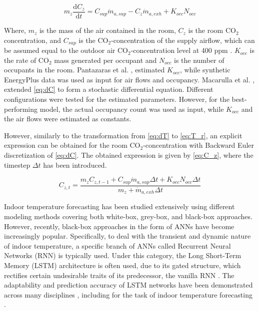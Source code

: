 \begin{equation}
    m_z \frac{\mathrm{d} C_z}{\mathrm{d} t} = C_{sup}\dot{m}_{a,sup} - C_z\dot{m}_{a,exh} + K_{occ} N_{occ}
    \label{eq:dC}
\end{equation}

Where, $m_z$ is the mass of the air contained in the room, $C_z$ is the room CO$_2$ concentration, and $C_{sup}$ is the CO$_2$-concentration of the supply airflow, which can be assumed equal to the outdoor air CO$_2$-concentration level at 400 ppm \cite{PANTAZARAS2016774,CIBSE}. $K_{occ}$ is the rate of CO$_2$ mass generated per occupant and $N_{occ}$ is the number of occupants in the room. Pantazaras et al. \cite{PANTAZARAS2016774}, estimated $K_{occ}$, while synthetic EnergyPlus data was used as input for air flows and occupancy. Macarulla et al. \cite{Macarulla2017}, extended \autoref{eq:dC} to form a stochastic differential equation. Different configurations were tested for the estimated parameters. However, for the best-performing model, the actual occupancy count was used as input, while $K_{occ}$ and the air flows were estimated as constants. 

However, similarly to the transformation from \autoref{eq:dT} to \autoref{eq:T_r}, an explicit expression can be obtained for the room CO$_2$-concentration with Backward Euler discretization of \autoref{eq:dC}. The obtained expression is given by \autoref{eq:C_z}, where the timestep $\Delta t$ has been introduced.


\begin{equation}
    C_{z,t} = \frac{m_z C_{z,t-1} + C_{sup} \dot{m}_{a,sup} \Delta t + K_{occ}N_{occ} \Delta t}{m_z + \dot{m}_{a,exh} \Delta t}
    \label{eq:C_z}
\end{equation}

Indoor temperature forecasting has been studied extensively using different modeling methods covering both white-box, grey-box, and black-box approaches. However, recently, black-box approaches in the form of ANNs have become increasingly popular. Specifically, to deal with the transient and dynamic nature of indoor temperature, a specific branch of ANNs called Recurrent Neural Networks (RNN) is typically used. Under this category, the Long Short-Term Memory (LSTM) architecture is often used, due to its gated structure, which rectifies certain undesirable traits of its predecessor, the vanilla RNN \cite{SHERSTINSKY2020132306}. The adaptability and prediction accuracy of LSTM networks have been demonstrated across many disciplines \cite{Houdt2020}, including for the task of indoor temperature forecasting \cite{Mtibaa2020,FANG2021111053}. 

